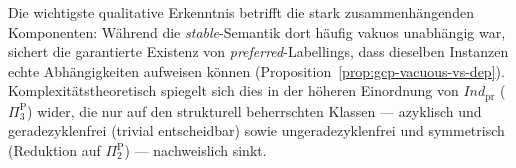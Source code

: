 Die wichtigste qualitative Erkenntnis betrifft die stark zusammenh\"angenden
Komponenten: W\"ahrend die \textit{stable}-Semantik dort h\"aufig vakuos
unabh\"angig war, sichert die garantierte Existenz von
\textit{preferred}-Labellings, dass dieselben Instanzen echte Abh\"angigkeiten
aufweisen k\"onnen (Proposition~\ref{prop:gcp-vacuous-vs-dep}). Komplexit\"atstheoretisch
spiegelt sich dies in der h\"oheren Einordnung von
\(\textit{Ind}_{\mathrm{pr}}\) (\(\Pi_3^{\mathrm P}\)) wider, die nur auf den
strukturell beherrschten Klassen --- azyklisch und geradezyklenfrei
(trivial entscheidbar) sowie ungeradezyklenfrei und symmetrisch (Reduktion auf
\(\Pi_2^{\mathrm P}\)) --- nachweislich sinkt.
